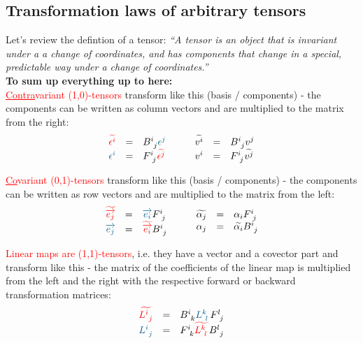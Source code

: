\subsection{Transformation laws of arbitrary tensors}
Let's review the defintion of a tensor: \emph{``A tensor is an object that is invariant under a
a change of coordinates, and has components that change in a special, predictable way
under a change of coordinates.''} \\

\textbf{To sum up everything up to here:}\\

\textcolor{red}{\underline{Contra}variant (1,0)-tensors} transform like this (basis /
components) - the components can be written as column vectors and are multiplied to the
matrix from the right:
\begin{equation}
    \begin{array}{rcl}
        \hdcbtvc{i} & = & B^{i~}_{~j} \hdcbvc{j} \\
        \hdcbvc{i} & = & F^{i~}_{~j}  \hdcbtvc{j}
    \end{array}
    \qquad
    \begin{array}{rcl}
        \hdtvc{i} & = & B^{i~}_{~j} \hdvc{j} \\
        \hdvc{i} & = & F^{i~}_{~j}  \hdtvc{j}
    \end{array}
\end{equation}

\textcolor{red}{\underline{Co}variant (0,1)-tensors} transform like this (basis /
components) - the components can be written as row vectors and are multiplied to the
matrix from the left:
\begin{equation}
    \begin{array}{rcl}
        \hdbtv{j} & = & \hdbv{i}  F^{i~}_{~j} \\
        \hdbv{j} & = & \hdbtv{i} B^{i~}_{~j} 
    \end{array}
    \qquad
    \begin{array}{rcl}
        \widetilde{{\alpha_j}} & = & {\alpha_i} F^{i~}_{~j}  \\
        {\alpha_j} & = & \widetilde{{\alpha_i}} B^{i~}_{~j}
    \end{array}
\end{equation}

\textcolor{red}{Linear maps are (1,1)-tensors}, i.e. they have a vector and a covector
part and transform like this - the matrix of the coefficients of the linear map is
multiplied from the left and the right with the respective forward or backward
transformation matrices:
\begin{equation}
    \begin{array}{rcl}
        \textcolor{red}{\widetilde{L^{i~}_{~j}}} & = &
        B^{i~}_{~k} \textcolor{MidnightBlue}{L^{k~}_{~l}} F^{l~}_{~j} \\
        \textcolor{MidnightBlue}{L^{i~}_{~j}} & = &
        F^{i~}_{~k} \textcolor{red}{\widetilde{L^{k~}_{~l}}} B^{l~}_{~j}
    \end{array}
\end{equation}

